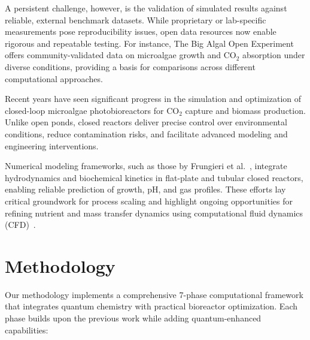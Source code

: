 \documentclass{article}
\begin{document}
A persistent challenge, however, is the validation of simulated results against reliable, external benchmark datasets. While proprietary or lab-specific measurements pose reproducibility issues, open data resources now enable rigorous and repeatable testing. For instance, The Big Algal Open Experiment~\cite{bigalgae2018} offers community-validated data on microalgae growth and CO$_2$ absorption under diverse conditions, providing a basis for comparisons across different computational approaches.

Recent years have seen significant progress in the simulation and optimization of closed-loop microalgae photobioreactors for CO$_2$ capture and biomass production. Unlike open ponds, closed reactors deliver precise control over environmental conditions, reduce contamination risks, and facilitate advanced modeling and engineering interventions.

Numerical modeling frameworks, such as those by Frungieri et al.~\cite{frungieri2022}, integrate hydrodynamics and biochemical kinetics in flat-plate and tubular closed reactors, enabling reliable prediction of growth, pH, and gas profiles. These efforts lay critical groundwork for process scaling and highlight ongoing opportunities for refining nutrient and mass transfer dynamics using computational fluid dynamics (CFD)~\cite{ojaniemi2025}.

\section{Methodology}

Our methodology implements a comprehensive 7-phase computational framework that integrates quantum chemistry with practical bioreactor optimization. Each phase builds upon the previous work while adding quantum-enhanced capabilities:
\end{document}
